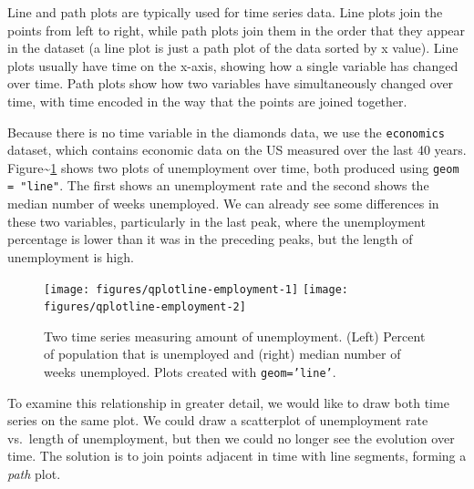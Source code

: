 
Line and path plots are typically used for time series data. Line plots
join the points from left to right, while path plots join them in the
order that they appear in the dataset (a line plot is just a path plot
of the data sorted by x value). Line plots usually have time on the
x-axis, showing how a single variable has changed over time. Path plots
show how two variables have simultaneously changed over time, with time
encoded in the way that the points are joined together.

Because there is no time variable in the diamonds data, we use the
\texttt{economics} dataset, which contains economic data on the US
measured over the last 40 years.
Figure\textasciitilde{}\ref{fig:line-employment} shows two plots of
unemployment over time, both produced using \texttt{geom = "line"}. The
first shows an unemployment rate and the second shows the median number
of weeks unemployed. We can already see some differences in these two
variables, particularly in the last peak, where the unemployment
percentage is lower than it was in the preceding peaks, but the length
of unemployment is high. 
 

\begin{Shaded}
\begin{Highlighting}[]
\StringTok{ }  \NormalTok{)}
  \NormalTok{)}
\end{Highlighting}
\end{Shaded}

\begin{figure}
\texttt{[image: figures/qplotline-employment-1]} \texttt{[image: figures/qplotline-employment-2]} \caption{Two time series measuring amount of unemployment.  (Left) Percent of population that is unemployed and (right) median number of weeks unemployed.  Plots created with \texttt{geom='line'}.\label{fig:line-employment}}
\end{figure}

To examine this relationship in greater detail, we would like to draw
both time series on the same plot. We could draw a scatterplot of
unemployment rate vs.~length of unemployment, but then we could no
longer see the evolution over time. The solution is to join points
adjacent in time with line segments, forming a \emph{path} plot.

